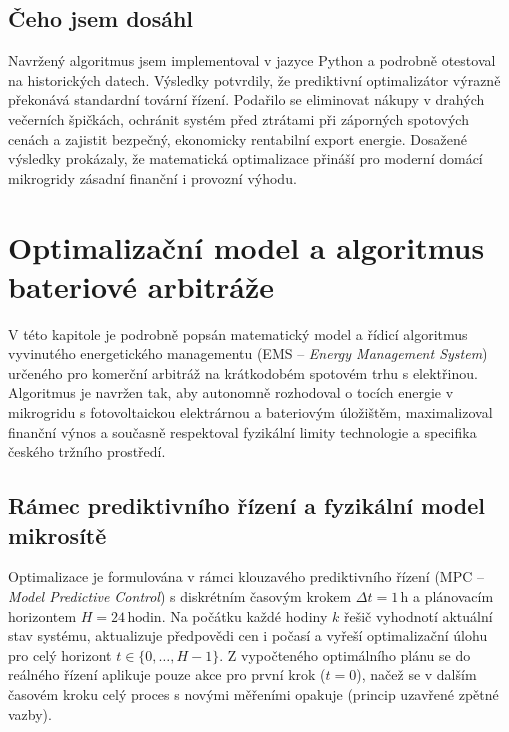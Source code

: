 \documentclass[FM,BP]{tulthesis}
\begin{document}
	\section*{Čeho jsem dosáhl}
	Navržený algoritmus jsem implementoval v jazyce Python a podrobně otestoval na historických datech. Výsledky potvrdily, že prediktivní optimalizátor výrazně překonává standardní tovární řízení. Podařilo se eliminovat nákupy v drahých večerních špičkách, ochránit systém před ztrátami při záporných spotových cenách a zajistit bezpečný, ekonomicky rentabilní export energie. Dosažené výsledky prokázaly, že matematická optimalizace přináší pro moderní domácí mikrogridy zásadní finanční i provozní výhodu.


	\chapter{Optimalizační model a algoritmus bateriové arbitráže}
	\label{chap:optimalizator}

	V této kapitole je podrobně popsán matematický model a řídicí algoritmus
	vyvinutého energetického managementu (EMS -- \textit{Energy Management System})
	určeného pro komerční arbitráž na krátkodobém spotovém trhu s elektřinou.
	Algoritmus je navržen tak, aby autonomně rozhodoval o tocích energie v mikrogridu
	s fotovoltaickou elektrárnou a bateriovým úložištěm, maximalizoval finanční výnos
	a současně respektoval fyzikální limity technologie a specifika českého tržního prostředí.

	\section{Rámec prediktivního řízení a fyzikální model mikrosítě}
	\label{sec:mpc_ramec}

	Optimalizace je formulována v rámci klouzavého prediktivního řízení (MPC -- \textit{Model Predictive Control})
	s diskrétním časovým krokem $\Delta t = 1\,\text{h}$ a plánovacím horizontem $H = 24\,\text{hodin}$.
	Na počátku každé hodiny $k$ řešič vyhodnotí aktuální stav systému, aktualizuje předpovědi
	cen i počasí a vyřeší optimalizační úlohu pro celý horizont $t \in \{0, \dots, H-1\}$.
	Z vypočteného optimálního plánu se do reálného řízení aplikuje pouze akce pro první krok ($t = 0$),
	načež se v dalším časovém kroku celý proces s novými měřeními opakuje (princip uzavřené zpětné vazby).
\end{document}
